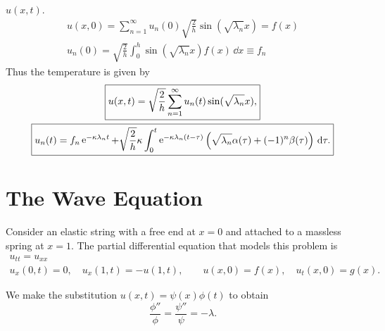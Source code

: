 $u(x,t)$.  
\begin{gather*}
  u(x,0) = \sum_{n=1}^\infty u_n(0) \sqrt{ \frac{2}{h} } \sin( \sqrt{\lambda_n} x ) 
  = f(x) \\
  u_n(0) = \sqrt{ \frac{2}{h} } \int_0^h \sin( \sqrt{\lambda_n} x ) f(x) \,\dd x
  \equiv f_n
\end{gather*}
Thus the temperature is given by
\begin{gather*}
  \boxed{
    u(x,t) = \sqrt{ \frac{2}{h} } \sum_{n=1}^\infty u_n(t) \sin( \sqrt{\lambda_n} x ),  
    } \\
  \boxed{
    u_n(t) = f_n \mathop{\mathrm{e}}\nolimits^{- \kappa \lambda_n t} + \sqrt{ \frac{2}{h} } \kappa 
    \int_0^t \mathop{\mathrm{e}}\nolimits^{-\kappa \lambda_n (t- \tau)} 
    \left( \sqrt{\lambda_n} \alpha(\tau) + (-1)^n \beta(\tau) \right) 
    \,\mathrm{d} \tau.
    }
\end{gather*}
























\section{The Wave Equation}
Consider an elastic string with a free end at $x=0$ and attached to a
massless spring at $x=1$.  The partial differential equation that models
this problem is
\begin{gather*}
  u_{t t} = u_{xx} \\
  u_x(0,t) = 0, \quad u_x(1,t) = - u(1,t), \qquad
  u(x,0) = f(x), \quad u_t(x,0) = g(x).
\end{gather*}

We make the substitution $u(x,t) = \psi(x) \phi(t)$ to obtain
\[ \frac{\phi''}{\phi} = \frac{\psi''}{\psi} = -\lambda. \]

